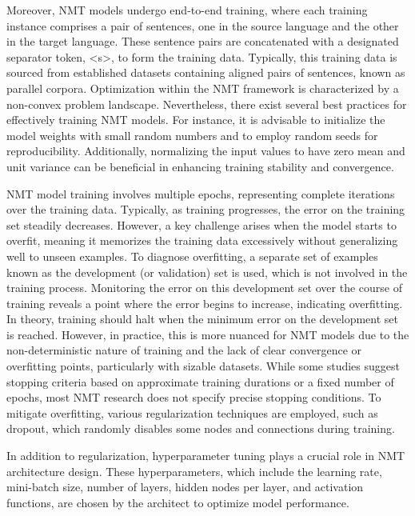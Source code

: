 Moreover, NMT models undergo end-to-end training, where each training instance comprises a pair of sentences, one in the source language and the other in the target language. These sentence pairs are concatenated with a designated separator token, <s>, to form the training data. Typically, this training data is sourced from established datasets containing aligned pairs of sentences, known as parallel corpora. Optimization within the NMT framework is characterized by a non-convex problem landscape.
Nevertheless, there exist several best practices for effectively training NMT models. For instance, it is advisable to initialize the model weights with small random numbers and to employ random seeds for reproducibility. Additionally, normalizing the input values to have zero mean and unit variance can be beneficial in enhancing training stability and convergence.

NMT model training involves multiple epochs, representing complete iterations over the training data. Typically, as training progresses, the error on the training set steadily decreases. However, a key challenge arises when the model starts to overfit, meaning it memorizes the training data excessively without generalizing well to unseen examples. To diagnose overfitting, a separate set of examples known as the development (or validation) set is used, which is not involved in the training process. Monitoring the error on this development set over the course of training reveals a point where the error begins to increase, indicating overfitting.
In theory, training should halt when the minimum error on the development set is reached. However, in practice, this is more nuanced for NMT models due to the non-deterministic nature of training and the lack of clear convergence or overfitting points, particularly with sizable datasets. While some studies suggest stopping criteria based on approximate training durations or a fixed number of epochs, most NMT research does not specify precise stopping conditions. To mitigate overfitting, various regularization techniques are employed, such as dropout, which randomly disables some nodes and connections during training.

In addition to regularization, hyperparameter tuning plays a crucial role in NMT architecture design. These hyperparameters, which include the learning rate, mini-batch size, number of layers, hidden nodes per layer, and activation functions, are chosen by the architect to optimize model performance.
